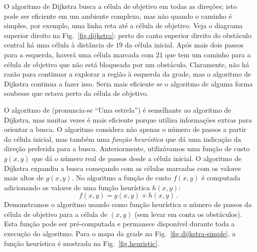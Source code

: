 {O algoritmo de Dijkstra busca a célula de objetivo em todas as direções; isto pode ser eficiente em um ambiente complexo, mas não quando o caminho é simples, por exemplo, uma linha reta até a célula de objetivo. Veja o diagrama superior direito na Fig.~\ref{fig.dijkstra}: perto do canto superior direito do obstáculo central há uma célula à distância de $19$ da célula inicial. Após mais dois passos para a esquerda, haverá uma célula marcada com $21$ que tem um caminho para a célula de objetivo que não está bloqueada por um obstáculo. Claramente, não há razão para continuar a explorar a região à esquerda da grade, mas o algoritmo de Dijkstra continua a fazer isso. Seria mais eficiente se o algoritmo de alguma forma soubesse que estava perto da célula de objetivo.

O algoritmo de \emph{\astar{}} (pronuncia-se ``Uma estrela'') é semelhante ao algoritmo de Dijkstra, mas muitas vezes é mais eficiente porque utiliza informações extras para orientar a busca. O algoritmo \astar{} considera não apenas o número de passos a partir da célula inicial, mas também uma \emph{função heurística} que dá uma indicação da direção preferida para a busca. Anteriormente, utilizávamos uma função de custo $g(x,y)$ que dá o número real de passos desde a célula inicial. O algoritmo de Dijkstra expandiu a busca começando com as células marcadas com os valores mais altos de $g(x,y)$. No algoritmo \astar{} a função de custo $f(x,y)$ é computada adicionando os valores de uma função heurística $h(x,y)$:
\[
f(x,y) = g(x,y) + h(x,y)\,.
\]
Demonstramos o algoritmo \astar{} usando como função heurística o número de passos da célula de objetivo  para a célula de $(x,y)$ (sem levar em conta os obstáculos). Esta função pode ser pré-computada e permanece disponível durante toda a execução do algoritmo. Para o mapa da grade na Fig.~\ref{fig.dijkstra-simple}, a função heurística é mostrada na Fig.~\ref{fig.heuristic}.

}
